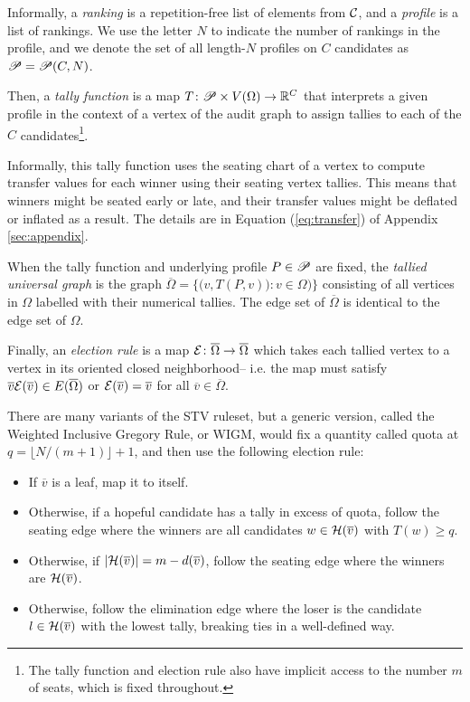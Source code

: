 Informally, a \emph{ranking} is a repetition-free list of elements from $\mathcal{C}$, and a \emph{profile} is a list of rankings. 
We use the letter $N$ to indicate the number of rankings in the profile, and we denote the set of all length-$N$ profiles on $C$ candidates as $\mathscr{P} = \mathscr{P}(C, N)$.

Then, a \emph{tally function} is a map $T\colon \mathscr{P}\times V(\Omega)\to \mathbb{R}^C$ that interprets a given profile in the context of a vertex of the audit graph to assign tallies to each of the $C$ candidates\footnote{\label{note1}The tally function and election rule also have implicit access to the number $m$ of seats, which is fixed throughout.
}. 

Informally, this tally function uses the seating chart of a vertex to compute transfer values for each winner using their seating vertex tallies. 
This means that winners might be seated early or late, and their transfer values might be deflated or inflated as a result. The details are in Equation (\ref{eq:transfer}) of Appendix \ref{sec:appendix}.

When the tally function and underlying profile $P\in\mathscr{P}$ are fixed, the \emph{tallied universal graph} is the graph $\overline{\Omega}=\{\big(v, T(P,v)\big)\colon v\in\Omega)\}$ consisting of all vertices in $\Omega$ labelled with their numerical tallies.
The edge set of $\overline{\Omega}$ is identical to the edge set of $\Omega$.

Finally, an \emph{election rule} is a map $\mathcal{E}\colon \overline{\Omega}\to \overline{\Omega}$ which takes each tallied vertex to a vertex in its oriented closed neighborhood\footnotemark[1] -- i.e. the map must satisfy $\overline{v}\mathcal{E}(\overline{v})\in E(\overline{\Omega})$ or $\mathcal{E}(\overline{v}) = \overline{v}$ for all $\overline{v}\in\overline{\Omega}$.

There are many variants of the STV ruleset, but a generic version, called the Weighted Inclusive Gregory Rule, or WIGM, would fix a quantity called quota at $q = \lfloor N/(m+1)\rfloor +1$, and then use the following election rule:
\begin{itemize}
	\item If $\overline{v}$ is a leaf, map it to itself.
	\item Otherwise, if a hopeful candidate has a tally in excess of quota, follow the seating edge where the winners are all candidates $w\in \mathcal{H}(\overline{v})$ with $T(w)\geq q$.
	\item Otherwise, if $|\mathcal{H}(\overline{v})|=m-d(\overline{v})$, follow the seating edge where the winners are $\mathcal{H}(\overline{v})$.
	\item Otherwise, follow the elimination edge where the loser is the candidate $l\in \mathcal{H}(\overline{v})$ with the lowest tally, breaking ties in a well-defined way.
\end{itemize}

